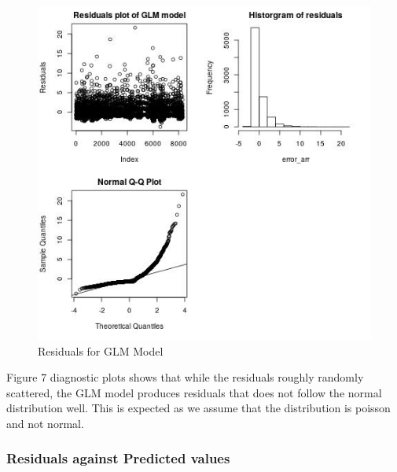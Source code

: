 \documentclass[12pt, letterpaper] {article}
\begin{document}
\begin{figure}[H]
    \centering
    \includegraphics[width=\textwidth, height=0.4\textheight]{Images/Full_GLM_resids.jpg}
    \caption{Residuals for GLM Model}
    \label{fig:Residuals for GLM Model}
\end{figure}

\noindent Figure 7 diagnostic plots shows that while the residuals roughly randomly scattered, the GLM model produces residuals that does not follow the normal distribution well. This is expected as we assume that the distribution is poisson and not normal. 

\subsubsection{Residuals against Predicted values}
\end{document}
